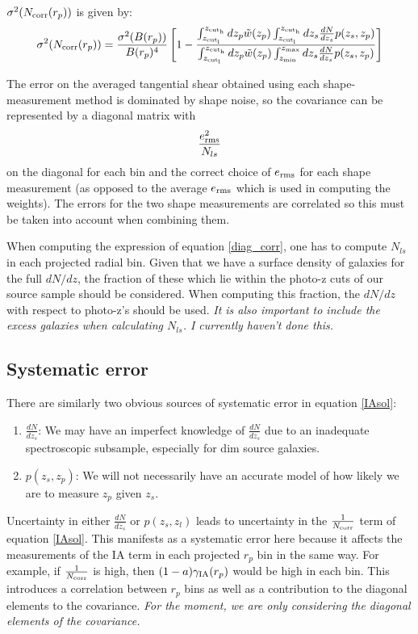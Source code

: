 \documentclass[onecolumn,amsmath,aps,fleqn, superscriptaddress]{revtex4}
\begin{document}
$\sigma^2(N_{\rm corr}(r_p))$ is given by:
\begin{equation}
\sigma^2(N_{\rm corr}(r_p)) = \frac{\sigma^2(B(r_p))}{B(r_p)^4}\left[1-\frac{\int_{z_{\rm cut_l}}^{z_{\rm cut_h}} dz_p \tilde{w}(z_p) \int_{z_{\rm cut_l}}^{z_{\rm cut_h}} dz_s\frac{dN}{dz_s} p(z_s, z_p)}{\int_{z_{\rm cut_l}}^{z_{\rm cut_h}} dz_p  \tilde{w}(z_p) \int_{z_{\rm min}}^{z_{\rm max}} dz_s\frac{dN}{dz_s} p(z_s, z_p)}\right]
\label{Ncorr_err}
\end{equation}

The error on the averaged tangential shear obtained using each shape-measurement method is dominated by shape noise, so the covariance can be represented by a diagonal matrix with 
\begin{equation}
\frac{e_{\rm rms}^2}{N_{ls}}
\label{diag_corr}
\end{equation} 
on the diagonal for each bin and the correct choice of $e_{\rm rms}$ for each shape measurement (as opposed to the average $e_{\rm rms}$ which is used in computing the weights). The errors for the two shape measurements are correlated so this must be taken into account when combining them. 

When computing the expression of equation \ref{diag_corr}, one has to compute $N_{ls}$ in each projected radial bin. Given that we have a surface density of galaxies for the full $dN/dz$, the fraction of these which lie within the photo-z cuts of our source sample should be considered. When computing this fraction, the $dN / dz$ with respect to photo-z's should be used. {\it It is also important to include the excess galaxies when calculating $N_{ls}$. I currently haven't done this.}

\subsection*{Systematic error}

There are similarly two obvious sources of systematic error in equation \ref{IAsol}:
\begin{enumerate}
\item{$\frac{dN}{dz_s}$: We may have an imperfect knowledge of $\frac{dN}{dz_s}$ due to an inadequate spectroscopic subsample, especially for dim source galaxies.}
\item{$p(z_s, z_p)$: We will not necessarily have an accurate model of how likely we are to measure $z_p$ given $z_s$.}
\end{enumerate}

Uncertainty in either $\frac{dN}{dz_s}$ or $p(z_s, z_l)$ leads to uncertainty in the $\frac{1}{N_{\rm corr}}$ term of equation \ref{IAsol}. This manifests as a systematic error here because it affects the measurements of the IA term in each projected $r_p$ bin in the same way. For example, if $\frac{1}{N_{\rm corr}}$ is high, then $(1-a)\gamma_{\rm IA}(r_p)$ would be high in each bin. This introduces a correlation between $r_p$ bins as well as a contribution to the diagonal elements to the covariance. {\it For the moment, we are only considering the diagonal elements of the covariance.}
\end{document}
